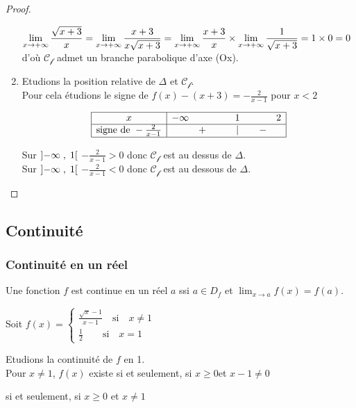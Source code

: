\begin{example}
\begin{proof}
\begin{enumerate}
$\displaystyle \lim_{x \to +\infty}\frac{\sqrt{x+3}}{x} = \displaystyle\lim_{x \to +\infty} \frac{x+3}{x\sqrt{x+3}}=\displaystyle\lim_{x \to +\infty} \frac{x+3}{x} \times \displaystyle\lim_{x \to +\infty}\frac{1}{\sqrt{x+3}}= 1 \times 0 =0 $ d'où $ \mathcal{C_{f}} $ admet un branche  parabolique d'axe (Ox).
\item Etudions la position relative de $ \Delta $ et $ \mathcal{C_{f}} $.\\
Pour cela étudions le signe de $ f(x)-(x+3) = -\frac{2}{x-1} $ pour $ x < 2 $  

  \[\begin{array}{|c|ccccc|}
\hline
x & -\infty & & 1 & & 2\\ \hline
\text{signe de }-\frac{2}{x-1}  & & +\qquad &|  & \quad - & \\
\hline
\end{array}\]
 
  Sur $ \left]-\infty \;,\; 1\right[ $ $-\frac{2}{x-1} > 0  $ donc $ \mathcal{C_{f}} $ est au dessus de $ \Delta. $\\
   Sur $ \left]-\infty \;,\; 1\right[ $ $-\frac{2}{x-1} < 0  $ donc $ \mathcal{C_{f}} $ est au dessous de $ \Delta. $
\end{enumerate}
\end{proof}
\subsection{Continuité}
\subsubsection*{Continuité en un réel}

\begin{definition}
Une fonction $ f $ est continue en un réel $ a $ ssi $ a\in D_{f} $ et $\displaystyle \lim_{x \to a}f(x)=f(a) $.
\end{definition}


\begin{example}
Soit $ f (x)=\left\{\begin{array}{l} \frac{\sqrt{x}-1}{x-1}\quad \textrm{si} \quad x\neq 1 \\ \frac{1}{2}\quad \quad\textrm{si}\quad x= 1  \end{array} \right.$


Etudions la continuité   de $ f $ en 1.\\
 Pour $x\neq 1  $, $ f(x) $ existe si et seulement, si $ x\geq 0 $\quad et $x-1 \neq 0 $
 
si et seulement, si \quad $x\geq 0$ \quad   et $x\neq 1$


\end{example}
\end{example}

